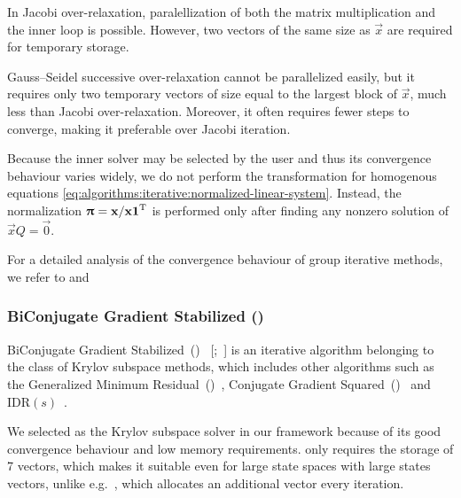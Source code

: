 In Jacobi over-relaxation, paralellization of both the matrix
multiplication and the inner loop is possible. However, two vectors of
the same size as $\vec{x}$ are required for temporary storage.

Gauss--Seidel successive over-relaxation cannot be parallelized easily,
but it requires only two temporary vectors of size equal to the largest
block of $\vec{x}$, much less than Jacobi over-relaxation. Moreover, it
often requires fewer steps to converge, making it preferable over
Jacobi iteration.

Because the inner solver may be selected by the user and thus its
convergence behaviour varies widely, we do not perform the
transformation for homogenous equations
\eqref{eq:algorithms:iterative:normalized-linear-system}. Instead, the
normalization $\bm{\mathrm{\uppi}} = \bm{\mathrm{x}} / \bm{\mathrm{x}}\bm{\mathrm{1}}^{\mathrm{T}}$ is performed
only after finding any nonzero solution of $\vec{x} Q = \vec{0}$.

For a detailed analysis of the convergence behaviour of group
iterative methods, we refer to
\citet[Chapter~14]{greenbaum1997iterative} and \citet{}

\subsubsection{BiConjugate Gradient Stabilized ()}

BiConjugate Gradient Stabilized~()%
~\mkbibbrackets{;~}
is an iterative algorithm belonging to the class of Krylov subspace
methods, which includes other algorithms such as the Generalized
Minimum Residual~()~\citep{saad1986gmres}, Conjugate Gradient
Squared~()~\citep{sonneveld1989cgs} and
IDR$(s)$~\citep{sonneveld2008idr}.

We selected  as the Krylov subspace solver in our
framework because of its good convergence behaviour and low memory
requirements.  only requires the storage of 7
vectors, which makes it suitable even for large state spaces with
large states vectors, unlike e.g.~, which allocates an
additional vector every iteration.

